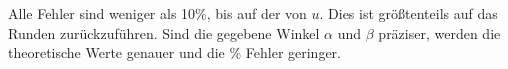  Alle Fehler sind weniger als 10\%, bis auf der von $u$. Dies ist größtenteils auf das Runden zurückzuführen. Sind die gegebene Winkel $\alpha$ und $\beta$ präziser, werden die theoretische Werte genauer und die \% Fehler geringer. 